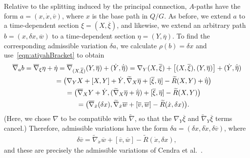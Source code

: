 \documentclass[pdftex]{sigma}
\numberwithin{equation}{section}
\begin{document}
 Relative to the splitting induced by the principal connection, $A$-paths have the form $ a = ( x, \dot{x} , \overline{ v } ) $, where $x$ is the base path in $ Q / G $. As before, we extend $a$ to a time-dependent section $ \xi = ( X, \overline{ \xi } ) $, and likewise, we extend an arbitrary path $b = ( x, \delta x , \overline{ w } ) $ to a time-dependent section $ \eta = ( Y, \overline{ \eta } ) $. To f\/ind the corresponding admissible variation $ \delta a $, we calculate $ \rho (b) = \delta x $ and use~\eqref{eqn:atiyahBracket} to obtain
 \begin{gather*}
 \overline{ \nabla } _a b = \overline{ \nabla } _\xi \eta + \dot{ \eta }
= \overline{ \nabla } _{ ( X, \overline{ \xi } ) } ( Y, \overline{ \eta } ) + ( \dot{ Y }, \dot{ \overline{ \eta } } ) = \nabla _Y ( X, \overline{ \xi } ) + \bigl[ ( X, \overline{ \xi } ), (Y, \overline{ \eta } ) \bigr] + ( \dot{ Y } , \dot{ \overline{ \eta } } ) \\
\hphantom{\overline{ \nabla } _a b}{} = \bigl( \nabla _Y X + [ X, Y ] + \dot{ Y } , \widetilde{ \nabla } _X \overline{ \eta } + [ \overline{ \xi }, \overline{ \eta } ] - \widetilde{ R } ( X, Y ) + \dot{ \overline{ \eta } } \bigr) \\
\hphantom{\overline{ \nabla } _a b}{}= \bigl( \overline{ \nabla } _X Y + \dot{ Y } , (\widetilde{ \nabla } _X \overline{ \eta } + \dot{ \overline{ \eta } }) + [ \overline{ \xi }, \overline{ \eta } ] - \widetilde{ R } ( X, Y ) \bigr) \\
\hphantom{\overline{ \nabla } _a b}{} = \bigl( \overline{ \nabla } _{ \dot{x} } (\delta x) , \widetilde{ \nabla } _{\dot{x}} \overline{ w } + [ \overline{ v }, \overline{ w } ] - \widetilde{ R } ( \dot{x}, \delta x ) \bigr).
 \end{gather*}
 (Here, we chose $ \nabla $ to be compatible with $ \widetilde{ \nabla } $, so that the $ \nabla _Y \overline{ \xi } $ and $ \widetilde{ \nabla } _Y \overline{ \xi } $ terms cancel.) Therefore, admissible variations have the form $ \delta a = ( \delta x, \delta \dot{x}, \delta \overline{ v } ) $, where
 \begin{gather*}
 \delta \overline{ v } = \widetilde{ \nabla } _{\dot{x}} \overline{ w } + [ \overline{ v }, \overline{ w } ] - \widetilde{ R } ( \dot{x}, \delta x ) ,
 \end{gather*}
 and these are precisely the admissible variations of Cendra et al.~\cite[Theorem~3.4.1]{CeMaRa2001}.
\end{document}
